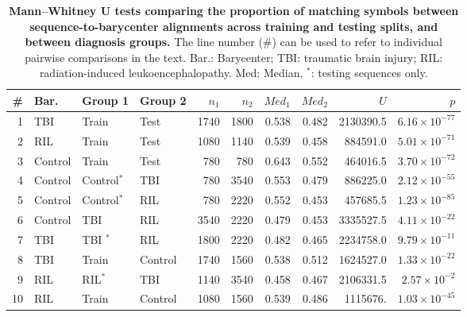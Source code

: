 \begin{chapterabstract}
        \begin{table}[htbp]
            \small
            \setlength{\tabcolsep}{4pt}                
            \begin{tabular}{r l l l r r r r r r}
            \toprule
            \# & \textbf{Bar.} & \textbf{Group 1} & \textbf{Group 2} & $n_1$ & $n_2$ & $Med_{1}$ & $Med_{2}$ & $U$ & $p$ \\
            \midrule
            1 & TBI & Train & Test & 1740 & 1800 & 0.538 & 0.482 & 2130390.5 & $6.16\times10^{-77}$ \\
            2 & RIL & Train & Test & 1080 & 1140 & 0.539 & 0.458 & 884591.0  & $5.01\times10^{-71}$ \\
            3 & Control & Train & Test & 780  & 780  & 0.643 & 0.552 & 464016.5  & $3.70\times10^{-72}$ \\
            4 & Control & Control$^*$& TBI & 780  & 3540  & 0.553 & 0.479 & 886225.0  & $2.12\times10^{-55}$ \\
            5 & Control & Control$^*$& RIL & 780  & 2220  & 0.552 & 0.453 & 457685.5  & $1.23\times10^{-85}$ \\
            6 & Control & TBI &  RIL  & 3540 & 2220& 0.479 & 0.453 & 3335527.5 & $4.11\times10^{-22}$ \\
            7 & TBI & TBI $^*$     & RIL & 1800 & 2220 & 0.482 & 0.465 & 2234758.0 & $9.79\times10^{-11}$ \\
            8 & TBI & Train & Control & 1740 & 1560 & 0.538 & 0.512 & 1624527.0 & $1.33\times10^{-22}$ \\
            9 & RIL & RIL$^*$ & TBI & 1140 &  3540 & 0.458  & 0.467 & 2106331.5 & $2.57\times10^{-2}$  \\
            10 & RIL & Train & Control & 1080 & 1560 & 0.539 & 0.486 & 1115676. & $1.03\times10^{-45}$  \\
            \bottomrule
            \end{tabular}
            \caption{\textbf{Mann--Whitney U tests comparing the proportion of matching symbols between sequence-to-barycenter alignments across training and testing splits, and between diagnosis groups.} The line number ($\#$) can be used to refer to individual pairwise comparisons in the text. Bar.: Barycenter; TBI: traumatic brain injury; RIL: radiation-induced leukoencephalopathy. Med: Median, $^*$: testing sequences only. }
            \label{tab:mannwhitney_medians_match_proportions}
        \end{table}


\end{chapterabstract}
